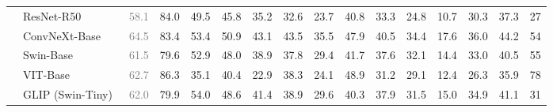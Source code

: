 \begin{table}[h]
{\begin{tabular}{l|l|c|ccc|c|ccc|cccc|>{}c|>{}c}
    \midrule
    \midrule
    & ResNet\footnotesize{-R50}\normalsize~\cite{resnet} & \textcolor{gray}{58.1} & 84.0 & 49.5 & 45.8 & 35.2 & 32.6 & 23.7 & 40.8 & 33.3 & 24.8 & 10.7 & 30.3 & 37.3 & 27 \\
    & ConvNeXt\footnotesize{-Base}\normalsize~\cite{Convnext} & \textcolor{gray}{64.5} & 83.4 & 53.4 & 50.9 & 43.1 & 43.5 & 35.5 & 47.9 & 40.5 & 34.4 & 17.6 & 36.0 & 44.2 & 54 \\
    & Swin\footnotesize{-Base}\normalsize~\cite{swin} & \textcolor{gray}{61.5} & 79.6 & 52.9 & 48.0 & 38.9 & 37.8 & 29.4 & 41.7 & 37.6 & 32.1 & 14.4 & 33.0 & 40.5 & 55 \\
    & VIT\footnotesize{-Base}\normalsize~\cite{vit} & \textcolor{gray}{62.7} & 86.3 & 35.1 & 40.4 & 22.9 & 38.3 & 24.1 & 48.9 & 31.2 & 29.1 & 12.4 & 26.3 & 35.9 & 78 \\
    & GLIP \footnotesize{(Swin-Tiny)}\normalsize~\cite{glip} & \textcolor{gray}{62.0} & 79.9 & 54.0 & 48.6 & 41.4 & 38.9 & 29.6 & 40.3 & 37.9 & 31.5 & 15.0 & 34.9 & 41.1 & 31 \\

\end{tabular}}
\end{table}
